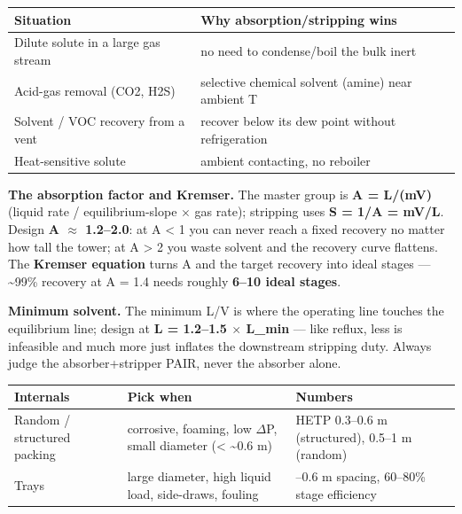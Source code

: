 \documentclass[11pt,a4paper]{article}
\begin{document}
\begin{longtable}[]{@{}>{\raggedright\arraybackslash}p{\dimexpr(\linewidth-4\tabcolsep)/2\relax}>{\raggedright\arraybackslash}p{\dimexpr(\linewidth-4\tabcolsep)/2\relax}@{}}
\toprule\noalign{}
Situation & Why absorption/stripping wins \\
\midrule\noalign{}
\endhead
\bottomrule\noalign{}
\endlastfoot
Dilute solute in a large gas stream & no need to condense/boil the bulk
inert \\
Acid-gas removal (CO2, H2S) & selective chemical solvent (amine) near
ambient T \\
Solvent / VOC recovery from a vent & recover below its dew point without
refrigeration \\
Heat-sensitive solute & ambient contacting, no reboiler \\
\end{longtable}

\textbf{The absorption factor and Kremser.} The master group is
\textbf{A = L/(m\textperiodcentered{}V)} (liquid rate / equilibrium-slope \(\times\) gas rate);
stripping uses \textbf{S = 1/A = mV/L}. Design \textbf{A \(\approx\) 1.2--2.0}: at
A \textless{} 1 you can never reach a fixed recovery no matter how tall
the tower; at A \textgreater{} 2 you waste solvent and the recovery
curve flattens. The \textbf{Kremser equation} turns A and the target
recovery into ideal stages --- \textasciitilde99\% recovery at A = 1.4
needs roughly \textbf{6--10 ideal stages}.

\textbf{Minimum solvent.} The minimum L/V is where the operating line
touches the equilibrium line; design at \textbf{L = 1.2--1.5 \(\times\) L\_min}
--- like reflux, less is infeasible and much more just inflates the
downstream stripping duty. Always judge the absorber+stripper PAIR,
never the absorber alone.

\begin{longtable}[]{@{}>{\raggedright\arraybackslash}p{\dimexpr(\linewidth-6\tabcolsep)/3\relax}>{\raggedright\arraybackslash}p{\dimexpr(\linewidth-6\tabcolsep)/3\relax}>{\raggedright\arraybackslash}p{\dimexpr(\linewidth-6\tabcolsep)/3\relax}@{}}
\toprule\noalign{}
Internals & Pick when & Numbers \\
\midrule\noalign{}
\endhead
\bottomrule\noalign{}
\endlastfoot
Random / structured packing & corrosive, foaming, low \(\Delta\)P, small diameter
(\textless{} \textasciitilde0.6 m) & HETP 0.3--0.6 m (structured),
0.5--1 m (random) \\
Trays & large diameter, high liquid load, side-draws, fouling & 0.3--0.6
m spacing, 60--80\% stage efficiency \\
\end{longtable}
\end{document}
